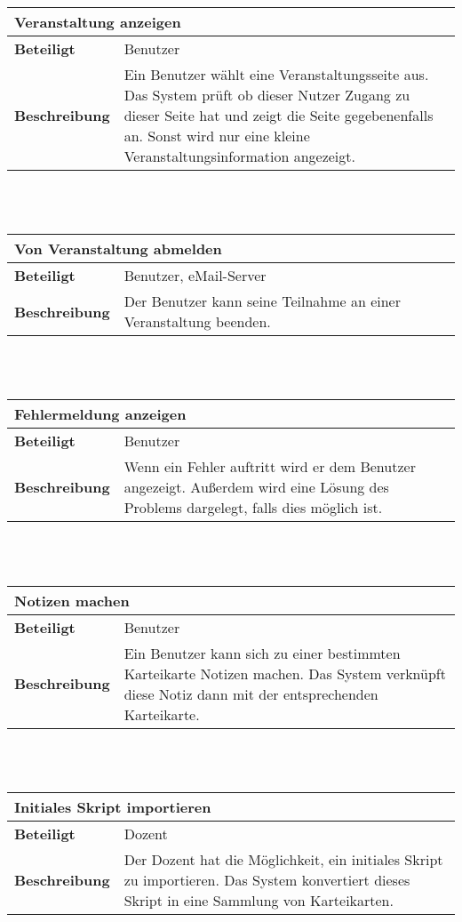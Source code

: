 \documentclass[12pt,a4paper]{article}
\begin{document}
\begin{tabular}{l p{10cm}}
\multicolumn{2}{l}{\textbf{Veranstaltung anzeigen}} \\ \hline
\textbf{Beteiligt} & Benutzer \\ \hline 
\textbf{Beschreibung} & Ein Benutzer wählt eine Veranstaltungsseite aus. Das System prüft ob dieser Nutzer Zugang zu dieser Seite hat und zeigt die Seite gegebenenfalls an. Sonst wird nur eine kleine Veranstaltungsinformation angezeigt. \\ 
\hline 
\end{tabular}\\\\

\begin{tabular}{l p{10cm}}
\multicolumn{2}{l}{\textbf{Von Veranstaltung abmelden}} \\ \hline
\textbf{Beteiligt} & Benutzer, eMail-Server \\ \hline 
\textbf{Beschreibung} & Der Benutzer kann seine Teilnahme an einer Veranstaltung beenden. \\ 
\hline 
\end{tabular}\\\\

\begin{tabular}{l p{10cm}}
\multicolumn{2}{l}{\textbf{Fehlermeldung anzeigen}} \\ \hline
\textbf{Beteiligt} & Benutzer \\ \hline 
\textbf{Beschreibung} & Wenn ein Fehler auftritt wird er dem Benutzer angezeigt. Außerdem wird eine Lösung des Problems dargelegt, falls dies möglich ist. \\ 
\hline 
\end{tabular}\\\\

\begin{tabular}{l p{10cm}}
\multicolumn{2}{l}{\textbf{Notizen machen}} \\ \hline
\textbf{Beteiligt} & Benutzer \\ \hline 
\textbf{Beschreibung} & Ein Benutzer kann sich zu einer bestimmten Karteikarte Notizen machen. Das System verknüpft diese Notiz dann mit der entsprechenden Karteikarte. \\ 
\hline 
\end{tabular}\\\\

\begin{tabular}{l p{10cm}}
\multicolumn{2}{l}{\textbf{Initiales Skript importieren}} \\ \hline
\textbf{Beteiligt} & Dozent \\ \hline 
\textbf{Beschreibung} & Der Dozent hat die Möglichkeit, ein initiales Skript zu importieren. Das System konvertiert dieses Skript in eine Sammlung von Karteikarten. \\ 
\hline 
\end{tabular}\\\\
\end{document}
